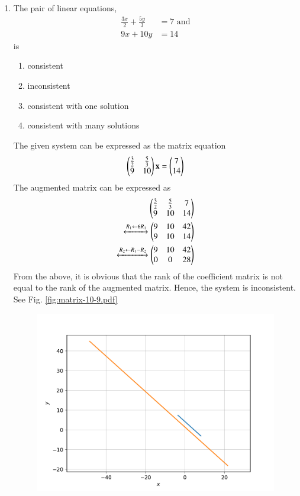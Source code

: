 \documentclass[journal,12pt,twocolumn]{IEEEtran}
\renewcommand\thesection{\arabic{section}}
\begin{document}
\begin{enumerate}[label=\thesection.\arabic*.,ref=\thesection.\theenumi]
\item The pair of linear equations,
	\begin{align}
		\frac{3x}{2} + \frac{5y}{3} &=7  \text{ and}\\
		9x + 10y &= 14
	\end{align}
		is
\begin{enumerate}
\item consistent
\item inconsistent 
\item consistent with one solution
\item consistent with many solutions
\end{enumerate}
\solution  The given system can be expressed as the matrix equation
	\begin{align}
		\begin{pmatrix}\frac{3}{2} & \frac{5}{3} 
		\\
9 & 10 
		\end{pmatrix}\mathbf{x}=\begin{pmatrix}7  \\14\end{pmatrix}
	\end{align}
	The augmented matrix can be expressed as 
	\begin{align}
		\begin{pmatrix}\frac{3}{2} & \frac{5}{3} & 7
		\\
		9 & 10 & 14
		\end{pmatrix}
		\\
		\xleftrightarrow[]{R_1 \leftarrow 6R_1}
		\begin{pmatrix}9 & 10 & 42
		\\
		9 & 10 &14
		\end{pmatrix}
		\\
		\xleftrightarrow[]{R_2 \leftarrow R_1 - R_2}
		\begin{pmatrix}9 & 10 & 42
		\\
		0 & 0 & 28
		\end{pmatrix}
	\end{align}
From the above, it is obvious that the rank of the coefficient matrix is not equal to the rank of the augmented matrix.  Hence, the system is inconsistent.	
    See Fig. 
	  \ref{fig:matrix-10-9.pdf}
  \begin{figure}
	  \centering 
	  \includegraphics[width=\columnwidth]{figs/matrix-10-9.pdf}

\end{figure}
\end{enumerate}
\end{document}
